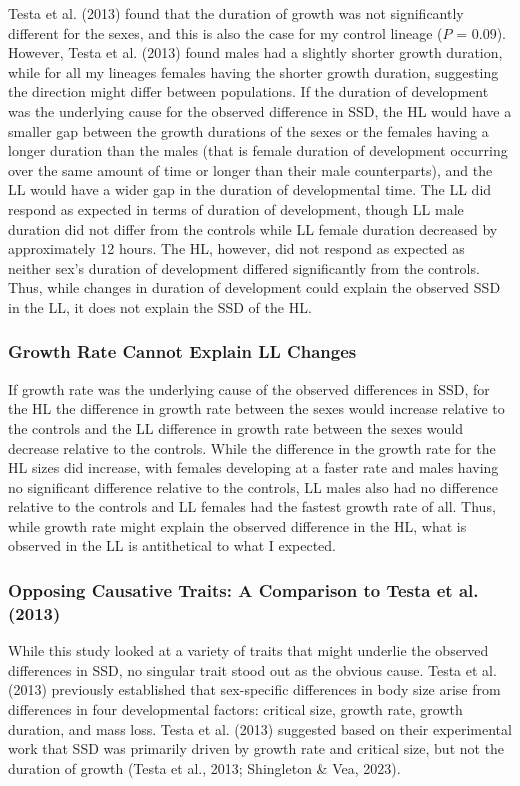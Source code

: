 \documentclass[12pt,reqno,oneside]{report}
\begin{document}
Testa et al. (2013) found that the duration of growth was not significantly different for the sexes, and this is also the case for my control lineage ($P$ = 0.09). However, Testa et al. (2013) found males had a slightly shorter growth duration, while for all my lineages females having the shorter growth duration, suggesting the direction might differ between populations. If the duration of development was the underlying cause for the observed difference in SSD, the HL would have a smaller gap between the growth durations of the sexes or the females having a longer duration than the males (that is female duration of development occurring over the same amount of time or longer than their male counterparts), and the LL would have a wider gap in the duration of developmental time. The LL did respond as expected in terms of duration of development, though LL male duration did not differ from the controls while LL female duration decreased by approximately 12 hours. The HL, however, did not respond as expected as neither sex's duration of development differed significantly from the controls. Thus, while changes in duration of development could explain the observed SSD in the LL, it does not explain the SSD of the HL.

\subsubsection{Growth Rate Cannot Explain LL Changes}

If growth rate was the underlying cause of the observed differences in SSD, for the HL the difference in growth rate between the sexes would increase relative to the controls and the LL difference in growth rate between the sexes would decrease relative to the controls. While the difference in the growth rate for the HL sizes did increase, with females developing at a faster rate and males having no significant difference relative to the controls, LL males also had no difference relative to the controls and LL females had the fastest growth rate of all. Thus, while growth rate might explain the observed difference in the HL, what is observed in the LL is antithetical to what I expected. 

\subsubsection{Opposing Causative Traits: A Comparison to Testa et al. (2013)}

While this study looked at a variety of traits that might underlie the observed differences in SSD, no singular trait stood out as the obvious cause. Testa et al. (2013) previously established that sex-specific differences in body size arise from differences in four developmental factors: critical size, growth rate, growth duration, and mass loss. Testa et al. (2013) suggested based on their experimental work that SSD was primarily driven by growth rate and critical size, but not the duration of growth (Testa et al., 2013; Shingleton \& Vea, 2023).
\end{document}
